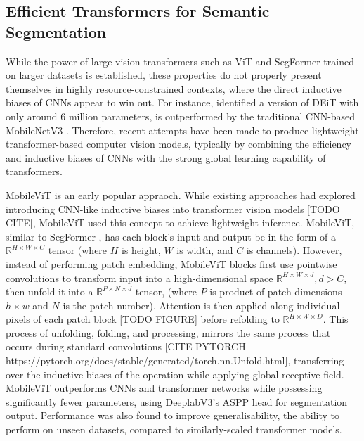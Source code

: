 \documentclass[a4paper,12pt]{report}
\begin{document}
\subsection{Efficient Transformers for Semantic Segmentation}

While the power of large vision transformers such as ViT and SegFormer trained on larger datasets is established, these properties do not properly present themselves in highly resource-constrained contexts, where the direct inductive biases of CNNs appear to win out. For instance, \cite{mehta_mobilevit_2022} identified a version of DEiT \cite{touvron_training_2021} with only around 6 million parameters, is outperformed by the traditional CNN-based MobileNetV3 \cite{howard_searching_2019}. Therefore, recent attempts have been made to produce lightweight transformer-based computer vision models, typically by combining the efficiency and inductive biases of CNNs with the strong global learning capability of transformers.

MobileViT \cite{mehta_mobilevit_2022} is an early popular appraoch. While existing approaches had explored introducing CNN-like inductive biases into transformer vision models [TODO CITE], MobileViT \cite{mehta_mobilevit_2022} used this concept to achieve lightweight inference. MobileViT, similar to SegFormer \cite{xie_segformer_2021}, has each block's input and output be in the form of a $\mathbb{R}^{H \times W \times C}$ tensor (where $H$ is height, $W$ is width, and $C$ is channels). However, instead of performing patch embedding, MobileViT blocks first use pointwise convolutions to transform input into a high-dimensional space $\mathbb{R}^{H \times W \times d}, d > C$, then unfold it into a $\mathbb{R}^{P \times N \times d}$ tensor, (where $P$ is product of patch dimensions $h \times w$ and $N$ is the patch number). Attention is then applied along individual pixels of each patch block [TODO FIGURE] before refolding to $\mathbb{R}^{H \times W \times D}$. This process of unfolding, folding, and processing, mirrors the same process that occurs during standard convolutions [CITE PYTORCH https://pytorch.org/docs/stable/generated/torch.nn.Unfold.html], transferring over the inductive biases of the operation while applying global receptive field. MobileViT outperforms CNNs and transformer networks while possessing significantly fewer parameters, using DeeplabV3's ASPP head \cite{chen_rethinking_2017} for segmentation output. Performance was also found to improve generalisability, the ability to perform on unseen datasets, compared to similarly-scaled transformer models.
\end{document}
